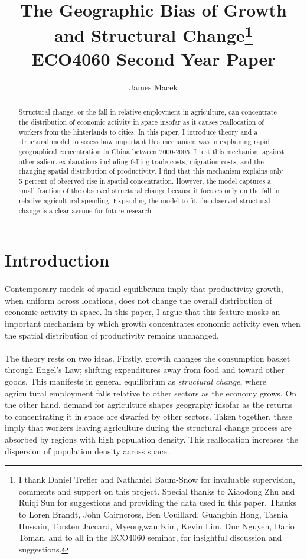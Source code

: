 \documentclass[]{article}
\title{The Geographic Bias of Growth and Structural Change\footnote{I thank Daniel Trefler and Nathaniel Baum-Snow for invaluable supervision, comments and support on this project. Special thanks to Xiaodong Zhu and Ruiqi Sun for suggestions and providing the data used in this paper. Thanks to Loren Brandt, John Cairncross, Ben Couillard, Guangbin Hong, Tasnia Hussain, Torsten Jaccard, Myeongwan Kim, Kevin Lim, Duc Nguyen, Dario Toman, and to all in the ECO4060 seminar, for insightful discussion and suggestions.} \\
\large ECO4060 Second Year Paper}
\author{James Macek}
\theoremstyle{plain}
\begin{document}
\maketitle

\begin{abstract}
Structural change, or the fall in relative employment in agriculture, can concentrate the distribution of economic activity in space insofar as it causes reallocation of workers from the hinterlands to cities. In this paper, I introduce theory and a structural model to assess how important this mechanism was in explaining rapid geographical concentration in China between 2000-2005. I test this mechanism against other salient explanations including falling trade costs, migration costs, and the changing spatial distribution of productivity. I find that this mechanism explains only 5 percent of observed rise in spatial concentration. However, the model captures a small fraction of the observed structural change because it focuses only on the fall in relative agricultural spending. Expanding the model to fit the observed structural change is a clear avenue for future research.   
\end{abstract}

\newpage
\section{Introduction}

\paragraph*{}
Contemporary models of spatial equilibrium imply that productivity growth, when uniform across locations, does not change the overall distribution of economic activity in space. In this paper, I argue that this feature masks an important mechanism by which growth concentrates economic activity even when the spatial distribution of productivity remains unchanged. 
\paragraph*{}
The theory rests on two ideas. Firstly, growth changes the consumption basket through Engel's Law; shifting expenditures away from food and toward other goods. This manifests in general equilibrium as \textit{structural change}, where agricultural employment falls relative to other sectors as the economy grows. On the other hand, demand for agriculture shapes geography insofar as the returns to concentrating it in space are dwarfed by other sectors. Taken together, these imply that workers leaving agriculture during the structural change process are absorbed by regions with high population density. This reallocation increases the dispersion of population density across space.
\end{document}
